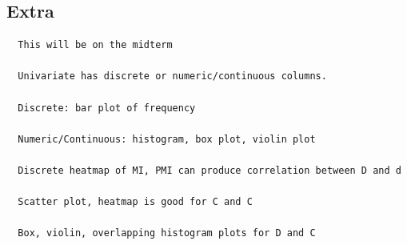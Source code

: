 \documentclass[11pt]{article}
\theoremstyle{definition}
\begin{document}
\subsection{Extra}
\begin{verbatim}
  This will be on the midterm
  
  Univariate has discrete or numeric/continuous columns.
  
  Discrete: bar plot of frequency

  Numeric/Continuous: histogram, box plot, violin plot

  Discrete heatmap of MI, PMI can produce correlation between D and d

  Scatter plot, heatmap is good for C and C

  Box, violin, overlapping histogram plots for D and C

\end{verbatim}
\end{document}
